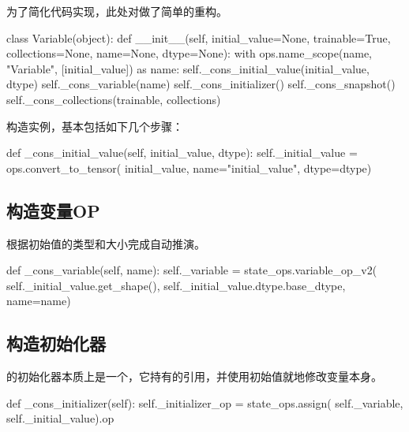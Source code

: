 \begin{content}

为了简化代码实现，此处对做了简单的重构。

\begin{leftbar}
\begin{python}
class Variable(object):
  def __init__(self, initial_value=None, trainable=True,
    collections=None, name=None, dtype=None):
    with ops.name_scope(name, "Variable", [initial_value]) as name:
      self._cons_initial_value(initial_value, dtype)
      self._cons_variable(name)
      self._cons_initializer()
      self._cons_snapshot()
    self._cons_collections(trainable, collections)
\end{python}
\end{leftbar}

构造实例，基本包括如下几个步骤：


\begin{leftbar}
\begin{python}
  def _cons_initial_value(self, initial_value, dtype):
    self._initial_value = ops.convert_to_tensor(
        initial_value, name="initial_value", dtype=dtype)
\end{python}
\end{leftbar}

\subsection{构造变量OP}

根据初始值的类型和大小完成自动推演。

\begin{leftbar}
\begin{python}
  def _cons_variable(self, name):
    self._variable = state_ops.variable_op_v2(
      self._initial_value.get_shape(),
      self._initial_value.dtype.base_dtype,
      name=name)
\end{python}
\end{leftbar}

\subsection{构造初始化器}

的初始化器本质上是一个，它持有的引用，并使用初始值就地修改变量本身。

\begin{leftbar}
\begin{python}
  def _cons_initializer(self):
    self._initializer_op = state_ops.assign(
      self._variable,
      self._initial_value).op
\end{python}
\end{leftbar}


\end{content}
